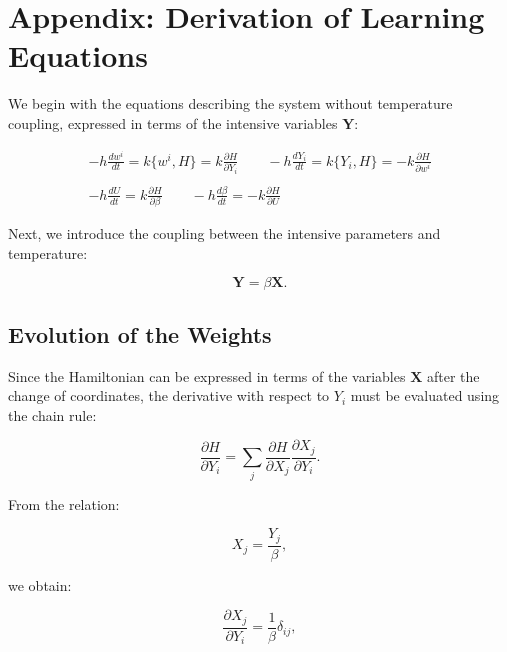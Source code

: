 \documentclass[12pt]{article}
\begin{document}
\section*{Appendix: Derivation of Learning Equations}

We begin with the equations describing the system without temperature coupling, expressed in terms of the intensive variables $\mathbf{Y}$:

\begin{equation}
\begin{aligned}
-h \frac{dw^{i}}{dt} = k\{w^{i}, H\} = k\frac{\partial H}{\partial Y_{i}} \qquad -h\frac{dY_{i}}{dt} = k\{Y_{i}, H  \} = -k\frac{\partial H}{\partial w^{i}}
\\
\\
-h \frac{dU}{dt} = k\frac{\partial H}{\partial \beta} \qquad -h\frac{d\beta}{dt} = -k\frac{\partial H}{\partial U}
\end{aligned}
\end{equation}

Next, we introduce the coupling between the intensive parameters and temperature:

\begin{equation}
\mathbf{Y} = \beta \mathbf{X}.
\end{equation}

\subsection*{Evolution of the Weights}

Since the Hamiltonian can be expressed in terms of the variables $\mathbf{X}$ after the change of coordinates, the derivative with respect to $Y_i$ must be evaluated using the chain rule: 

\begin{equation}
\frac{\partial H}{\partial Y_{i}} = \sum_j \frac{\partial H}{\partial X_{j}} \frac{\partial X_{j}}{\partial Y_{i}}.
\end{equation}

From the relation:

\begin{equation}
X_j = \frac{Y_j}{\beta},
\end{equation}

we obtain:

\begin{equation}
\frac{\partial X_j}{\partial Y_i} = \frac{1}{\beta}\delta_{ij},
\end{equation}
\end{document}
